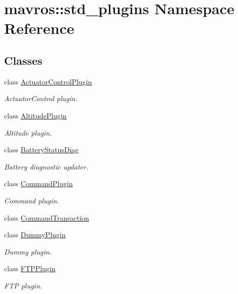 \hypertarget{namespacemavros_1_1std__plugins}{}\section{mavros\+::std\+\_\+plugins Namespace Reference}
\label{namespacemavros_1_1std__plugins}
\subsection*{Classes}
\begin{DoxyCompactItemize}
\item 
class \mbox{\hyperlink{classmavros_1_1std__plugins_1_1ActuatorControlPlugin}{Actuator\+Control\+Plugin}}
\begin{DoxyCompactList}\small\item\em Actuator\+Control plugin. \end{DoxyCompactList}\item 
class \mbox{\hyperlink{classmavros_1_1std__plugins_1_1AltitudePlugin}{Altitude\+Plugin}}
\begin{DoxyCompactList}\small\item\em Altitude plugin. \end{DoxyCompactList}\item 
class \mbox{\hyperlink{classmavros_1_1std__plugins_1_1BatteryStatusDiag}{Battery\+Status\+Diag}}
\begin{DoxyCompactList}\small\item\em Battery diagnostic updater. \end{DoxyCompactList}\item 
class \mbox{\hyperlink{classmavros_1_1std__plugins_1_1CommandPlugin}{Command\+Plugin}}
\begin{DoxyCompactList}\small\item\em Command plugin. \end{DoxyCompactList}\item 
class \mbox{\hyperlink{classmavros_1_1std__plugins_1_1CommandTransaction}{Command\+Transaction}}
\item 
class \mbox{\hyperlink{classmavros_1_1std__plugins_1_1DummyPlugin}{Dummy\+Plugin}}
\begin{DoxyCompactList}\small\item\em Dummy plugin. \end{DoxyCompactList}\item 
class \mbox{\hyperlink{classmavros_1_1std__plugins_1_1FTPPlugin}{F\+T\+P\+Plugin}}
\begin{DoxyCompactList}\small\item\em F\+TP plugin. \end{DoxyCompactList}\item 

\end{DoxyCompactItemize}
